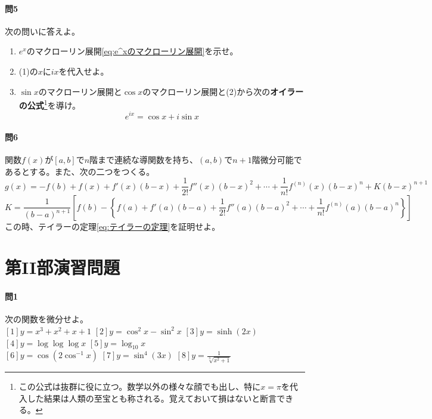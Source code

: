 \documentclass[a4j,dvipdfmx]{jsarticle}
\begin{document}
                \paragraph{問5}次の問いに答えよ。
                \begin{enumerate}\setcounter{enumi}{0}\renewcommand{\labelenumi}{(\arabic{enumi})}
                    \item $e^x$のマクローリン展開\ref{eq:e^xのマクローリン展開}を示せ。
                    \item (1)の$x$に$ix$を代入せよ。
                    \item $\sin x$のマクローリン展開と$\cos x$のマクローリン展開と(2)から次の\textbf{オイラーの公式}\footnote{この公式は抜群に役に立つ。数学以外の様々な顔でも出し、特に$x=\pi$を代入した結果は人類の至宝とも称される。覚えておいて損はないと断言できる。}を導け。
                        \begin{equation}
                            e^{ix}=\cos x+i\sin x
                        \end{equation}
                \end{enumerate}
                
                \paragraph{問6}関数$f(x)$が$[a,b]$で$n$階まで連続な導関数を持ち、$(a,b)$で$n+1$階微分可能であるとする。また、次の二つをつくる。
                \begin{equation*}
                    g(x)=-f(b)+f(x)+f'(x)(b-x)+\frac{1}{2!}f''(x)(b-x)^2+\cdots+\frac{1}{n!}f^{(n)}(x)(b-x)^n+K(b-x)^{n+1}
                \end{equation*}
                \begin{equation*}
                    K=\frac{1}{(b-a)^{n+1}}\left[f(b)-\left\{f(a)+f'(a)(b-a)+\frac{1}{2!}f''(a)(b-a)^2+\cdots+\frac{1}{n!}f^{(n)}(a)(b-a)^n\right\}\right]
                \end{equation*}
                この時、テイラーの定理\ref{eq:テイラーの定理}を証明せよ。
            \clearpage
            \section{第II部演習問題}
            \paragraph{問1}次の関数を微分せよ。\\
                $[1]y=x^3+x^2+x+1$\hspace{3mm}
                $[2]y=\cos^2 x-\sin^2 x$\hspace{3mm}
                $[3]y=\sinh(2x)$\hspace{3mm}
                $[4]y=\log\log\log x$\hspace{3mm}
                $[5]y=\log_{10}x$\\
                $[6]y=\cos(2\cos^{-1}x)$\hspace{3mm}
                $[7]y=\sin^{4}(3x)$\hspace{3mm}
                $\displaystyle[8]y=\frac{1}{\sqrt[3]{x^2+1}}$
            
\end{document}
